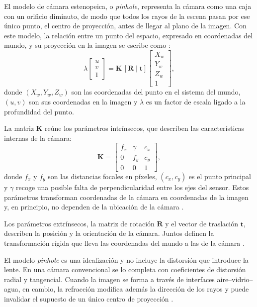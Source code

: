 El modelo de cámara estenopeica, o \emph{pinhole}, representa la cámara como una caja con un orificio diminuto, de modo que todos los rayos de la escena pasan por ese único punto, el centro de proyección, antes de llegar al plano de la imagen. Con este modelo, la relación entre un punto del espacio, expresado en coordenadas del mundo, y su proyección en la imagen se escribe como \parencite{Hartley2004,Zhang2000}:
\begin{equation}
\lambda \begin{bmatrix} u \\ v \\ 1 \end{bmatrix} = \mathbf{K}\,[\mathbf{R} \mid \mathbf{t}]\begin{bmatrix} X_w \\ Y_w \\ Z_w \\ 1 \end{bmatrix},
\label{eq:pinhole}
\end{equation}
donde $(X_w, Y_w, Z_w)$ son las coordenadas del punto en el sistema del mundo, $(u, v)$ son sus coordenadas en la imagen y $\lambda$ es un factor de escala ligado a la profundidad del punto.

La matriz $\mathbf{K}$ reúne los parámetros intrínsecos, que describen las características internas de la cámara:
\begin{equation}
\mathbf{K} = \begin{bmatrix} f_x & \gamma & c_x \\ 0 & f_y & c_y \\ 0 & 0 & 1 \end{bmatrix},
\label{eq:K}
\end{equation}
donde $f_x$ y $f_y$ son las distancias focales en píxeles, $(c_x, c_y)$ es el punto principal y $\gamma$ recoge una posible falta de perpendicularidad entre los ejes del sensor. Estos parámetros transforman coordenadas de la cámara en coordenadas de la imagen y, en principio, no dependen de la ubicación de la cámara \parencite{Hartley2004}.

Los parámetros extrínsecos, la matriz de rotación $\mathbf{R}$ y el vector de traslación $\mathbf{t}$, describen la posición y la orientación de la cámara. Juntos definen la transformación rígida que lleva las coordenadas del mundo a las de la cámara \parencite{Hartley2004,Zhang2000}.

El modelo \emph{pinhole} es una idealización y no incluye la distorsión que introduce la lente. En una cámara convencional se lo completa con coeficientes de distorsión radial y tangencial. Cuando la imagen se forma a través de interfaces aire--vidrio--agua, en cambio, la refracción modifica además la dirección de los rayos y puede invalidar el supuesto de un único centro de proyección \parencite{Treibitz2012,Seegraber2025}.

